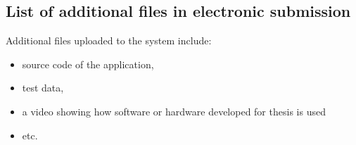 \documentclass[a4paper,twoside,12pt]{book}
\begin{document}
\begin{appendices}
\chapter*{List of additional files in electronic submission }

Additional files uploaded to the system include:
\begin{itemize}
																
\item source code of the application,
\item test data,
\item a video showing how software or hardware developed for thesis is used
\item etc.
\end{itemize}
 
\listoffigures
{}
\listoftables
{}
	

\end{appendices}
\end{document}
